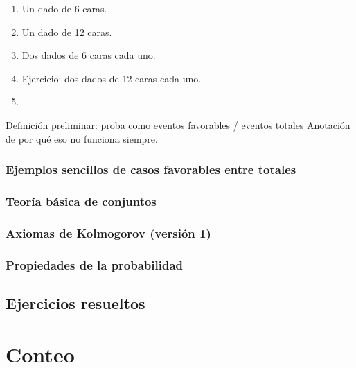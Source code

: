 \documentclass[
]{book}
\begin{document}
\begin{enumerate}
\def\labelenumi{\arabic{enumi}.}
\item
  Un dado de 6 caras.
\item
  Un dado de 12 caras.
\item
  Dos dados de 6 caras cada uno.
\item
  Ejercicio: dos dados de 12 caras cada uno.
\item
\end{enumerate}

Definición preliminar: proba como eventos favorables / eventos totales
Anotación de por qué eso no funciona siempre.

\hypertarget{ejemplos-sencillos-de-casos-favorables-entre-totales}{%
\subsection{Ejemplos sencillos de casos favorables entre totales}\label{ejemplos-sencillos-de-casos-favorables-entre-totales}}

\hypertarget{teoruxeda-buxe1sica-de-conjuntos}{%
\subsection{Teoría básica de conjuntos}\label{teoruxeda-buxe1sica-de-conjuntos}}

\hypertarget{axiomas-de-kolmogorov-versiuxf3n-1}{%
\subsection{Axiomas de Kolmogorov (versión 1)}\label{axiomas-de-kolmogorov-versiuxf3n-1}}

\hypertarget{propiedades-de-la-probabilidad}{%
\subsection{Propiedades de la probabilidad}\label{propiedades-de-la-probabilidad}}

\hypertarget{ejercicios-resueltos}{%
\section{Ejercicios resueltos}\label{ejercicios-resueltos}}

\hypertarget{conteo}{%
\chapter{Conteo}\label{conteo}}
\end{document}
